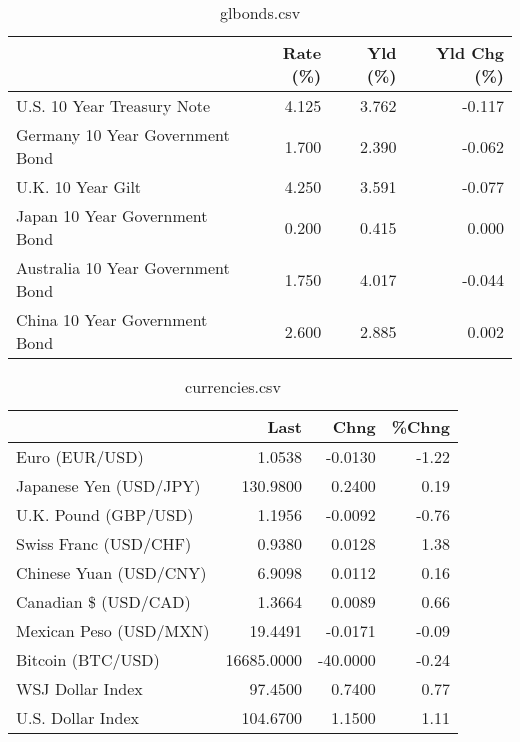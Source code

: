 \documentclass{article}%
\begin{document}
%


\begin{table}[htbp]%
\caption{glbonds.csv}%
\centering%
\begin{adjustbox}{width=1\textwidth}%
\begin{tabular}{lrrr}
\toprule
                                  &  Rate (\%) &  Yld (\%) &  Yld Chg (\%) \\
\midrule
       U.S. 10 Year Treasury Note &     4.125 &    3.762 &       -0.117 \\
  Germany 10 Year Government Bond &     1.700 &    2.390 &       -0.062 \\
                U.K. 10 Year Gilt &     4.250 &    3.591 &       -0.077 \\
    Japan 10 Year Government Bond &     0.200 &    0.415 &        0.000 \\
Australia 10 Year Government Bond &     1.750 &    4.017 &       -0.044 \\
    China 10 Year Government Bond &     2.600 &    2.885 &        0.002 \\
\bottomrule
\end{tabular}
%
\end{adjustbox}%
\end{table}

%


\begin{table}[htbp]%
\caption{currencies.csv}%
\centering%
\begin{adjustbox}{width=1\textwidth}%
\begin{tabular}{lrrr}
\toprule
                       &       Last &     Chng &  \%Chng \\
\midrule
        Euro (EUR/USD) &     1.0538 &  -0.0130 &  -1.22 \\
Japanese Yen (USD/JPY) &   130.9800 &   0.2400 &   0.19 \\
  U.K. Pound (GBP/USD) &     1.1956 &  -0.0092 &  -0.76 \\
 Swiss Franc (USD/CHF) &     0.9380 &   0.0128 &   1.38 \\
Chinese Yuan (USD/CNY) &     6.9098 &   0.0112 &   0.16 \\
  Canadian \$ (USD/CAD) &     1.3664 &   0.0089 &   0.66 \\
Mexican Peso (USD/MXN) &    19.4491 &  -0.0171 &  -0.09 \\
     Bitcoin (BTC/USD) & 16685.0000 & -40.0000 &  -0.24 \\
      WSJ Dollar Index &    97.4500 &   0.7400 &   0.77 \\
     U.S. Dollar Index &   104.6700 &   1.1500 &   1.11 \\
\bottomrule
\end{tabular}
%
\end{adjustbox}%
\end{table}

%
\end{document}
